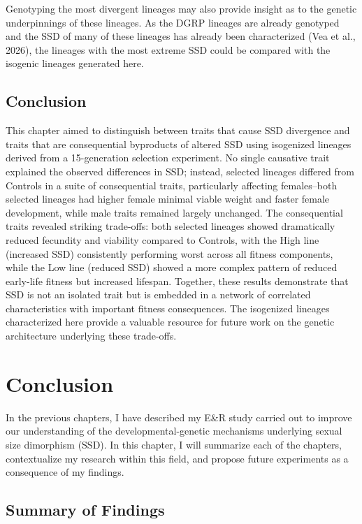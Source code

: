 \documentclass[12pt,reqno,oneside]{report}
\begin{document}
Genotyping the most divergent lineages may also provide insight as to the genetic underpinnings of these lineages. As the DGRP lineages are already genotyped and the SSD of many of these lineages has already been characterized (Vea et al., 2026), the lineages with the most extreme SSD could be compared with the isogenic lineages generated here.

\section{Conclusion}

This chapter aimed to distinguish between traits that cause SSD divergence and traits that are consequential byproducts of altered SSD using isogenized lineages derived from a 15-generation selection experiment. No single causative trait explained the observed differences in SSD; instead, selected lineages differed from Controls in a suite of consequential traits, particularly affecting females--both selected lineages had higher female minimal viable weight and faster female development, while male traits remained largely unchanged. The consequential traits revealed striking trade-offs: both selected lineages showed dramatically reduced fecundity and viability compared to Controls, with the High line (increased SSD) consistently performing worst across all fitness components, while the Low line (reduced SSD) showed a more complex pattern of reduced early-life fitness but increased lifespan. Together, these results demonstrate that SSD is not an isolated trait but is embedded in a network of correlated characteristics with important fitness consequences. The isogenized lineages characterized here provide a valuable resource for future work on the genetic architecture underlying these trade-offs.

\clearpage
\chapter{Conclusion}

In the previous chapters, I have described my E\&R study carried out to improve our understanding of the developmental-genetic mechanisms underlying sexual size dimorphism (SSD). In this chapter, I will summarize each of the chapters, contextualize my research within this field, and propose future experiments as a consequence of my findings.

\section{Summary of Findings}
\end{document}
